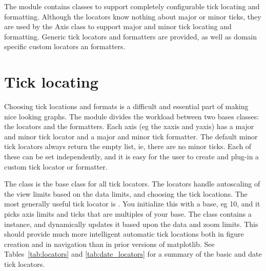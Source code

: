 \documentclass[twoside]{book}
\begin{document}
The  module contains classes to support
completely configurable tick locating and formatting.  Although the
locators know nothing about major or minor ticks, they are used by the
Axis class to support major and minor tick locating and formatting.
Generic tick locators and formatters are provided, as well as domain
specific custom locators an formatters.


\section{Tick locating}
\label{sec:ticklocs}

Choosing tick locations and formats is a difficult and essential part
of making nice looking graphs.  The  module
divides the workload between two bases classes: the locators and the
formatters.  Each axis (eg the xaxis and yaxis) has a major and minor
tick locator and a major and minor tick formatter.  The default minor
tick locators always return the empty list, ie, there are no minor
ticks.  Each of these can be set independently, and it is easy for the
user to create and plug-in a custom tick locator or formatter.

The  class is the base class for all
tick locators.  The locators handle autoscaling of the view limits
based on the data limits, and choosing the tick locations.  The most
generally useful tick locator is .  You
initialize this with a base, eg 10, and it picks axis limits and ticks
that are multiples of your base.  The class 
contains a  instance, and dynamically updates
it based upon the data and zoom limits.  This should provide much more
intelligent automatic tick locations both in figure creation and in
navigation than in prior versions of matplotlib.  See
Tables~\ref{tab:locators} and \ref{tab:date_locators} for a summary of
the basic and date tick locators.
\end{document}
